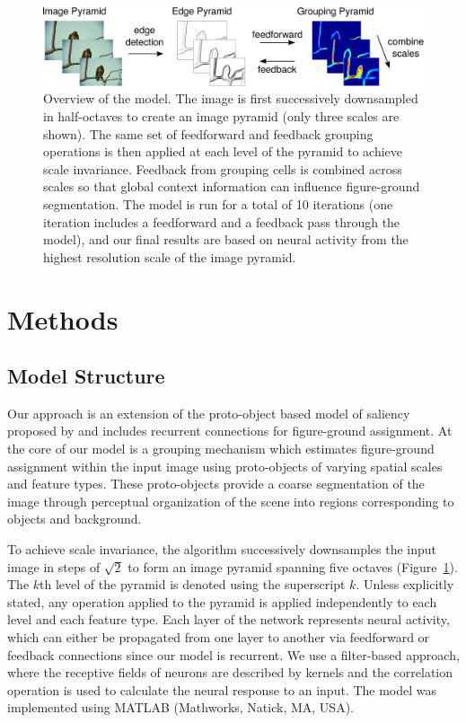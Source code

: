 \begin{figure}[t!]
\centering
\includegraphics[width=\textwidth]{NaturalImage/figs/model_scheme_new.eps}
\makeatletter
\let\@currsize\normalsize
\caption[Overview of the model for figure-ground organization of natural images]{Overview of the model. The image is first successively downsampled in half-octaves to create an image pyramid (only three scales are shown). The same set of feedforward and feedback grouping operations is then applied at each level of the pyramid to achieve scale invariance. Feedback from grouping cells is combined across scales so that
global context information can influence figure-ground segmentation. The model is run for a total of 10 iterations (one iteration includes a feedforward and a feedback pass through the model), and our final results are based on neural activity from the highest resolution scale of the image pyramid.}
\label{Fig:model_overview}
\end{figure}

\section{Methods} 
\label{sec:model}
\subsection{Model Structure}

Our approach is an extension of the 
proto-object based model of saliency proposed by
\cite{Russell_etal14} and includes recurrent connections for figure-ground assignment.
At the core of our model is a grouping mechanism which estimates figure-ground assignment within the input image using proto-objects of varying spatial scales and feature types. These proto-objects provide a coarse segmentation of the image through perceptual organization of the scene into regions corresponding to objects and background.
 
To achieve scale invariance, the algorithm
successively
downsamples the input image
 in steps of $\sqrt2$
to form an image pyramid spanning five octaves (Figure~\ref{Fig:model_overview}). The $k$th level
of the pyramid is denoted using the superscript $k$. Unless explicitly
stated, any operation applied to the pyramid is applied independently to each level and each feature type. Each layer of the network represents neural
activity, which can either be propagated from one layer to another via
feedforward or feedback connections since our model is recurrent. We use a filter-based approach, where the receptive fields of neurons are
described by kernels and the correlation operation is used to calculate the neural response to an input. The
model was implemented using MATLAB (Mathworks, Natick, MA,
USA).

